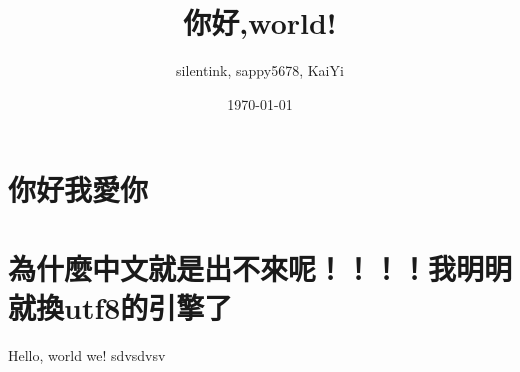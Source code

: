 \documentclass{article}
\title{你好,world!}
\author{silentink, sappy5678, KaiYi}
\date{\today}
\begin{document}
\maketitle
\section{你好我愛你}

\section{為什麼中文就是出不來呢！！！！我明明就換utf8的引擎了}
Hello, world we!
sdvsdvsv
\end{document}
